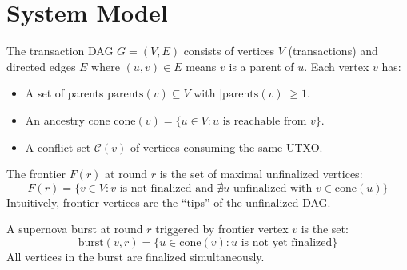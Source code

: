 \section{System Model}

\label{sec:nova-model}

\begin{definition}
The transaction DAG $G = (V, E)$ consists of vertices $V$ (transactions) and directed
edges $E$ where $(u, v) \in E$ means $v$ is a parent of $u$. Each vertex $v$ has:
\begin{itemize}[nosep]
\item A set of parents $\text{parents}(v) \subseteq V$ with $|\text{parents}(v)| \geq 1$.
\item An ancestry cone $\text{cone}(v) = \{u \in V : u \text{ is reachable from } v\}$.
\item A conflict set $\mathcal{C}(v)$ of vertices consuming the same UTXO.
\end{itemize}
\end{definition}

\begin{definition}[Frontier]
The frontier $F(r)$ at round $r$ is the set of maximal unfinalized vertices:
\[
F(r) = \{v \in V : v \text{ is not finalized and } \nexists u \text{ unfinalized with } v \in \text{cone}(u)\}
\]
Intuitively, frontier vertices are the ``tips'' of the unfinalized DAG.
\end{definition}

\begin{definition}
A supernova burst at round $r$ triggered by frontier vertex $v$ is the set:
\[
\text{burst}(v, r) = \{u \in \text{cone}(v) : u \text{ is not yet finalized}\}
\]
All vertices in the burst are finalized simultaneously.
\end{definition}

